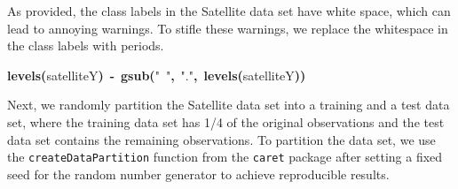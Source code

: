 \documentclass{article}
\makeatletter
\newcommand{\hlfunctioncall}[1]{\textcolor[rgb]{.5,0,.33}{\textbf{#1}}}%
\newcommand{\hlstring}[1]{\textcolor[rgb]{.6,.6,1}{#1}}%
\newcommand{\hlkeyword}[1]{\textbf{#1}}%
\newcommand{\hlassignement}[1]{\textbf{#1}}%
\newcommand{\hlsymbol}[1]{#1}%
\newenvironment{kframe}{%
 \def\FrameCommand##1{\hskip\@totalleftmargin \hskip-\fboxsep
 \colorbox{shadecolor}{##1}\hskip-\fboxsep
     \hskip-\linewidth \hskip-\@totalleftmargin \hskip\columnwidth}%
 \MakeFramed {\advance\hsize-\width
   \@totalleftmargin\z@ \linewidth\hsize
   \@setminipage}}%
 {\par\unskip\endMakeFramed}
\newenvironment{knitrout}{}{} %
\makeatother
\begin{document}
As provided, the class labels in the Satellite data set have white space, which
can lead to annoying warnings. To stifle these warnings, we replace the
whitespace in the class labels with periods.

\begin{knitrout}
\color{fgcolor}\begin{kframe}
\begin{flushleft}
\ttfamily\noindent
\hlfunctioncall{levels}\hlkeyword{(}\hlsymbol{satelliteY}\hlkeyword{)}{\ }\hlassignement{\usebox{\hlnormalsizeboxlessthan}-}{\ }\hlfunctioncall{gsub}\hlkeyword{(}\hlstring{"{}{\ }"{}}\hlkeyword{,}{\ }\hlstring{"{}."{}}\hlkeyword{,}{\ }\hlfunctioncall{levels}\hlkeyword{(}\hlsymbol{satelliteY}\hlkeyword{)}\hlkeyword{)}\mbox{}
\normalfont
\end{flushleft}
\end{kframe}
\end{knitrout}


Next, we randomly partition the Satellite data set into a training and a test
data set, where the training data set has 1/4 of the original observations and
the test data set contains the remaining observations. To partition the data set,
we use the {\tt createDataPartition} function from the {\tt caret} package after
setting a fixed seed for the random number generator to achieve reproducible
results.
\end{document}
